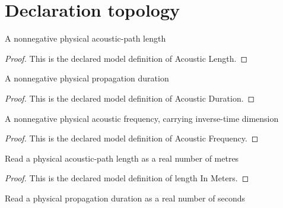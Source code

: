 \section{Declaration topology}
\begin{definition}
  \label{def:physics:phyx-mini-0201:phyxminiproblems-problemphyxmini0201-acousticlength}
  A nonnegative physical acoustic-path length
\end{definition}
\begin{proof}
  This is the declared model definition of Acoustic Length.
\end{proof}
\begin{definition}
  \label{def:physics:phyx-mini-0201:phyxminiproblems-problemphyxmini0201-acousticduration}
  A nonnegative physical propagation duration
\end{definition}
\begin{proof}
  This is the declared model definition of Acoustic Duration.
\end{proof}
\begin{definition}
  \label{def:physics:phyx-mini-0201:phyxminiproblems-problemphyxmini0201-acousticfrequency}
  A nonnegative physical acoustic frequency, carrying inverse-time dimension
\end{definition}
\begin{proof}
  This is the declared model definition of Acoustic Frequency.
\end{proof}
\begin{definition}
  \label{def:physics:phyx-mini-0201:phyxminiproblems-problemphyxmini0201-lengthinmeters}
  Read a physical acoustic-path length as a real number of metres
\end{definition}
\begin{proof}
  This is the declared model definition of length In Meters.
\end{proof}
\begin{definition}
  \label{def:physics:phyx-mini-0201:phyxminiproblems-problemphyxmini0201-durationinseconds}
  Read a physical propagation duration as a real number of seconds
\end{definition}
